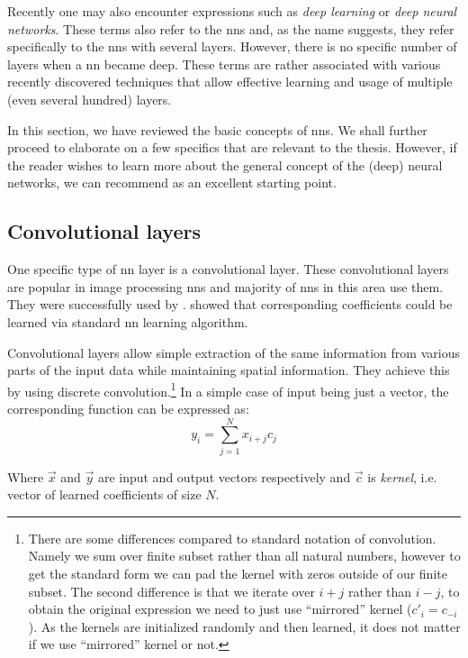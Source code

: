Recently one may also encounter expressions such as \emph{deep learning} or \emph{deep neural networks}. These terms also refer to the \glspl{nn} and, as the name suggests, they refer specifically to the \glspl{nn} with several layers. However, there is no specific number of layers when a \gls{nn} became deep. These terms are rather associated with various recently discovered techniques that allow effective learning and usage of multiple (even several hundred) layers.

In this section, we have reviewed the basic concepts of \glspl{nn}. We shall further proceed to elaborate on a few specifics that are relevant to the thesis. However, if the reader wishes to learn more about the general concept of the (deep) neural networks, we can recommend \cite{deeplearningbook} as an excellent starting point.

\subsection{Convolutional layers}
\label{sec:conv}

One specific type of \gls{nn} layer is a convolutional layer. These convolutional layers are popular in image processing \glspl{nn} and majority of \glspl{nn} in this area use them. They were successfully used by \cite{conv}. \cite{convbackprop} showed that corresponding coefficients could be learned via standard \gls{nn} learning algorithm.

Convolutional layers allow simple extraction of the same information from various parts of the input data while maintaining spatial information. They achieve this by using discrete convolution.\footnote{There are some differences compared to standard notation of convolution. Namely we sum over finite subset rather than all natural numbers, however to get the standard form we can pad the kernel with zeros outside of our finite subset. The second difference is that we iterate over $i+j$ rather than $i-j$, to obtain the original expression we need to just use ``mirrored'' kernel ($c'_i = c_{-i}$). As the kernels are initialized randomly and then learned, it does not matter if we use ``mirrored'' kernel or not.} In a simple case of input being just a vector, the corresponding function can be expressed as:
$$y_i = \sum_{j=1}^N x_{i+j} c_j$$

Where $\vec{x}$ and $\vec{y}$ are input and output vectors respectively and $\vec{c}$ is \emph{kernel}, i.e. vector of learned coefficients of size $N$.


